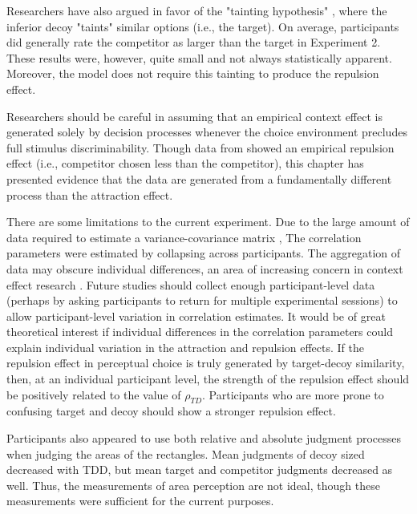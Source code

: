 Researchers have also argued in favor of the "tainting hypothesis" \parencite{simonson2014vices,spektorWhenGoodLooks2018b}, where the inferior decoy "taints" similar options (i.e., the target). On average, participants did generally rate the competitor as larger than the target in Experiment 2. These results were, however, quite small and not always statistically apparent. Moreover, the model does not require this tainting to produce the repulsion effect.

Researchers should be careful in assuming that an empirical context effect is generated solely by decision processes whenever the choice environment precludes full stimulus discriminability. Though data from \textcite{spektorWhenGoodLooks2018b} showed an empirical repulsion effect (i.e., competitor chosen less than the competitor), this chapter has presented evidence that the data are generated from a fundamentally different process than the attraction effect. 

There are some limitations to the current experiment. Due to the large amount of data required to estimate a variance-covariance matrix \parencite{martin2021,merkle2023opaque}, The correlation parameters were estimated by collapsing across participants. The aggregation of data may obscure individual differences, an area of increasing concern in context effect research \parencite{liewAppropriacyAveragingStudy2016b,trueblood2015fragile,davis2023illustrated}. Future studies  should collect enough participant-level data (perhaps by asking participants to return for multiple experimental sessions) to allow participant-level variation in correlation estimates. It would be of great theoretical interest if individual differences in the correlation parameters could explain individual variation in the attraction and repulsion effects. If the repulsion effect in perceptual choice is truly generated by target-decoy similarity, then, at an individual participant level, the strength of the repulsion effect should be positively related to the value of $\rho_{TD}$. Participants who are more prone to confusing target and decoy should show a stronger repulsion effect.

Participants also appeared to use both relative and absolute judgment processes when judging the areas of the rectangles. Mean judgments of decoy sized decreased with TDD, but mean target and competitor judgments decreased as well. Thus, the measurements of area perception are not ideal, though these measurements were sufficient for the current purposes. 

